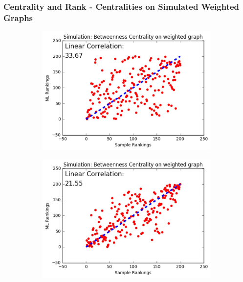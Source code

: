 \documentclass[9pt]{beamer}
\begin{document}
\begin{frame}
\frametitle{Centrality and Rank - Centralities on Simulated Weighted Graphs}
\vspace{0.15in}
\begin{figure}[H]
\centering
\begin{subfigure}{.32\textwidth}
  \centering
  \includegraphics[width=0.95\linewidth]{BCW_NL.jpeg}
\end{subfigure}
\begin{subfigure}{.32\textwidth}
	\centering
    \includegraphics[width=0.95\linewidth]{BCW_ML.jpeg}
\end{subfigure}
\begin{subfigure}{.32\textwidth}

\end{subfigure}
\end{figure}
\end{frame}
\end{document}
